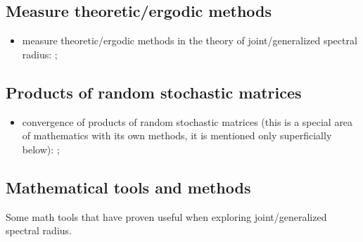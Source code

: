 \documentclass[a4paper,fleqn]{article}
\let\cite=\citep
\begin{document}
\subsection*{Measure theoretic/ergodic methods}
\begin{itemize}
  \item measure theoretic/ergodic methods in the theory of joint/generalized
    spectral radius: \cite{AltPar:CDC19, AltPar:SIAMJCO20, BochiRams:JMD16,
      BG:JEP19, BM:JAMS02, Dai:N11, Dai:JDE11, Dai:LAA12, Dai:JFI14,
      DHX:SIAMJCO08, DHX:CDC08, DHX:ArXiv11:1, DHX:ERA11, DHX:AUT11,
      DHX:PAMS13, DHX:IEEETAC15, Gomes:2017, KM:ArXiv25, Moh:JSP22,
      Morris:ADVM10, Morris:JFA12, Morris:PLMS13, Morris:EDTS17,
      Morris:EDTS17:2, NSch:LAA99, OgurMart:LAA14, ZCL:DCDSA18};
\end{itemize}

\subsection*{Products of random stochastic matrices}
\begin{itemize}
  \item convergence of products of random stochastic matrices (this is a
    special area of mathematics with its own methods, it is mentioned only
    superficially below): \cite{AT:JMAA77, BXMS:IEEETSP13, Cohn:IJMMS,
      CMS:LAA21, CMMS:EJP23, DHH:ArXiv14, DHX:AUT11, OgurMart:LAA13,
      Leiz:LAA92, LimaRah:JPA94, MTG:ArXiv25, OM:ArXiv26, Prot:MS11, 
      Thomas:ArXiv11, Thomas:ArXiv13, Wolf:PAMS};
\end{itemize}

\subsection*{Mathematical tools and methods}
Some math tools that have proven useful when exploring
joint/generalized spectral radius.
\end{document}
